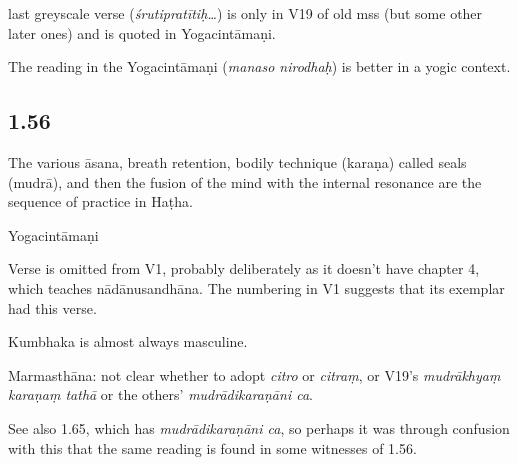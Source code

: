 \begin{ekdosis}
\begin{testimonia}[hp01_055_4]
\end{testimonia}

\begin{philcomm}[hp01_055_4]
last greyscale verse (\emph{śrutipratītiḥ…}) is only in V19 of old mss (but some other later ones) and is quoted in Yogacintāmaṇi.

The reading in the Yogacintāmaṇi (\emph{manaso nirodhaḥ}) is better in a yogic context.
\end{philcomm}

\subsection*{1.56}
\begin{translation}[hp01_056]
The various āsana, breath retention, bodily technique (karaṇa) called seals (mudrā), and then the fusion of the mind with the internal resonance are the sequence of practice in Haṭha.
\end{translation}

\begin{sources}[hp01_056]
\end{sources}

\begin{testimonia}[hp01_056]
Yogacintāmaṇi

\begin{versinnote}
\end{versinnote}

\end{testimonia}

\begin{philcomm}[hp01_056]
Verse is omitted from V1, probably deliberately as it doesn’t have chapter 4, which teaches nādānusandhāna. The numbering in V1 suggests that its exemplar had this verse.

Kumbhaka is almost always masculine.

Marmasthāna: not clear whether to adopt \emph{citro} or \emph{citraṃ}, or V19’s \emph{mudrākhyaṃ karaṇaṃ tathā} or the others’ \emph{mudrādikaraṇāni ca}.

See also 1.65, which has \emph{mudrādikaraṇāni ca}, so perhaps it was through confusion with this that the same reading is found in some witnesses of 1.56.


\end{philcomm}
\end{ekdosis}
